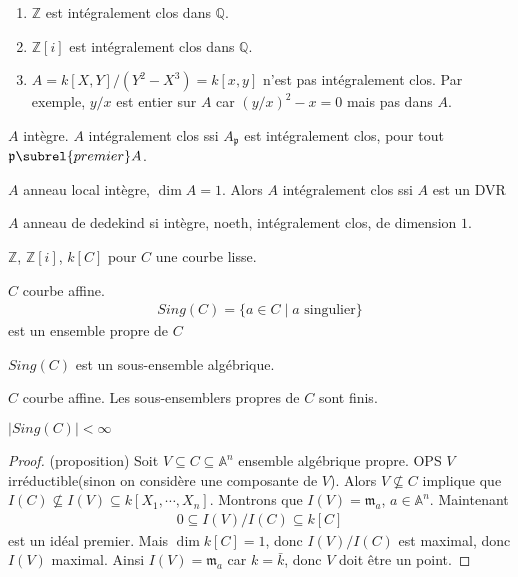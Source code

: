         \begin{expl}
            \begin{enumerate}
                \item $\mathbb{Z}$ est intégralement clos dans $\mathbb{Q}$.
                \item $\mathbb{Z}[i]$ est intégralement clos dans $\mathbb{Q}$.
                \item $A = k[X,Y]/(Y^2 - X^3) = k[x,y]$ n'est pas intégralement clos. Par exemple, $y/x$ est entier sur $A$ car $(y/x)^2 - x = 0$ mais pas dans $A$.
            \end{enumerate}
        \end{expl}
        \begin{theo}
            $A$ intègre. $A$ intégralement clos ssi $A_\mathfrak{p}$ est intégralement clos, pour tout $\mathfrak{p} \subrel{premier} A$.
        \end{theo}
        \begin{theo}
            $A$ anneau local intègre, $\dim A = 1$. Alors $A$ intégralement clos ssi $A$ est un DVR
        \end{theo}
        \begin{defi}
            $A$ anneau de dedekind si intègre, noeth, intégralement clos, de dimension $1$.
        \end{defi}
        \begin{expl}
            $\mathbb{Z}$, $\mathbb{Z}[i]$, $k[C]$ pour $C$ une courbe lisse.
        \end{expl}
        \begin{theo}
            $C$ courbe affine.
            \begin{align*}
                Sing(C) = \{a \in C \mid a \text{ singulier} \}
            \end{align*}
            est un ensemble propre de $C$
        \end{theo}
        \begin{exo}
            $Sing(C)$ est un sous-ensemble algébrique.
        \end{exo}
        \begin{prop}
            $C$ courbe affine. Les sous-ensemblers propres de $C$ sont finis.
        \end{prop}
        \begin{coro}
            $|Sing(C)| < \infty$
        \end{coro}
        \begin{proof} (proposition)
            Soit $V \subseteq C \subseteq \mathbb{A}^n$ ensemble algébrique propre. OPS $V$ irréductible(sinon on considère une composante de $V$). Alors $V \nsubseteq C$ implique que $I(C) \nsubseteq I(V) \subseteq k[X_1, \cdots, X_n]$. Montrons que $I(V) = \mathfrak{m}_a$, $a \in \mathbb{A}^n$. Maintenant
            \begin{align*}
                0 \subseteq I(V)/I(C) \subseteq k[C]
            \end{align*}
            est un idéal premier. Mais $\dim k[C] = 1$, donc $I(V)/I(C)$ est maximal, donc $I(V)$ maximal. Ainsi $I(V) = \mathfrak{m}_a$ car $k = \bar k$, donc $V$ doit être un point.
        \end{proof}